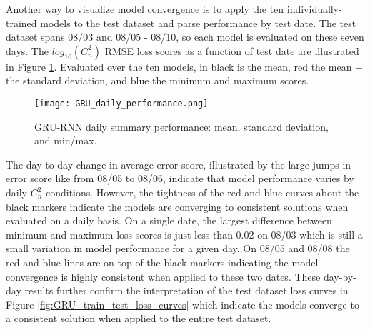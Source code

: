 Another way to visualize model convergence is to apply the ten individually-trained models to the test dataset and parse performance by test date. The test dataset spans 08/03 and 08/05 - 08/10, so each model is evaluated on these seven days. The $log_{10}(C_{n}^{2})$ RMSE loss scores as a function of test date are illustrated in Figure \ref{fig:GRU_daily_performance}. Evaluated over the ten models, in black is the mean, red the mean $\pm$ the standard deviation, and blue the minimum and maximum scores.
\begin{figure}[h!]
	\centering
	\texttt{[image: GRU\_daily\_performance.png]}
	\caption{GRU-RNN daily summary performance: mean, standard deviation, and min/max.}
	\label{fig:GRU_daily_performance}
\end{figure}
The day-to-day change in average error score, illustrated by the large jumps in error score like from 08/05 to 08/06, indicate that model performance varies by daily $C_{n}^{2}$ conditions. However, the tightness of the red and blue curves about the black markers indicate the models are converging to consistent solutions when evaluated on a daily basis. On a single date, the largest difference between minimum and maximum loss scores is just less than 0.02 on 08/03 which is still a small variation in model performance for a given day. On 08/05 and 08/08 the red and blue lines are on top of the black markers indicating the model convergence is highly consistent when applied to these two dates. These day-by-day results further confirm the interpretation of the test dataset loss curves in Figure \ref{fig:GRU_train_test_loss_curves} which indicate the models converge to a consistent solution when applied to the entire test dataset.

